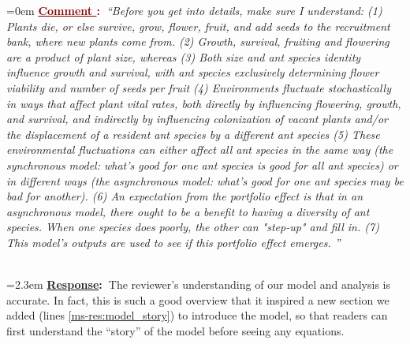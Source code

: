 \documentclass[12pt]{article}
\newcounter{cN}
\newcommand{\comment}[1]{
	\vspace{2em}
	\refstepcounter{cN} %
	\noindent \hangindent=0em \textbf{\textcolor{Maroon}{\uline{Comment \thecN}:~}}\emph{``#1''}
	}
\newcommand{\response}[1]{
	\\[0.25em]
	\hangindent=2.3em \textbf{\textcolor{NavyBlue}{\uline{Response}:~}}#1
	}
\begin{document}
\comment{Before you get into details, make sure I understand:
(1)     Plants die, or else survive, grow, flower, fruit, and add seeds to the recruitment bank, where new plants come from.
(2)     Growth, survival, fruiting and flowering are a product of plant size, whereas
(3)     Both size and ant species identity influence growth and survival, with ant species exclusively determining flower viability and number of seeds per fruit
(4)     Environments fluctuate stochastically in ways that affect plant vital rates, both directly by influencing flowering, growth, and survival, and indirectly by influencing colonization of vacant plants and/or the displacement of a resident ant species by a different ant species
(5)     These environmental fluctuations can either affect all ant species in the same way (the synchronous model:  what's good for one ant species is good for all ant species) or in different ways (the asynchronous model: what's good for one ant species may be bad for another).
(6)     An expectation from the portfolio effect is that in an asynchronous model, there ought to be a benefit to having a diversity of ant species. When one species does poorly, the other can "step-up" and fill in.
(7)     This model's outputs are used to see if this portfolio effect emerges. }
\response{The reviewer's understanding of our model and analysis is accurate. 
	In fact, this is such a good overview that it inspired a new section we added (lines \ref{ms-res:model_story}) to introduce the model, so that readers can first understand the ``story'' of the model before seeing any equations.}


\end{document}
